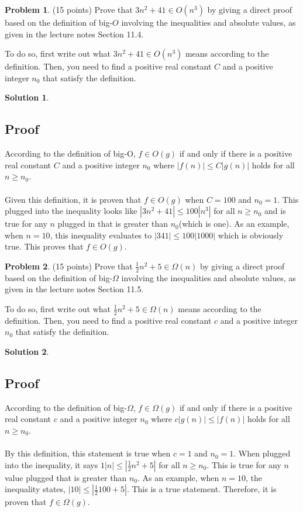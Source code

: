 \documentclass{article}
\theoremstyle{definition}
\newtheorem{problem}{Problem}
\newtheorem*{solution}{Solution}
\begin{document}
\newpage
\begin{problem} (15 points)
Prove that $3n^2+41 \in O(n^3)$ by giving a direct proof based on the definition of 
big-$O$ involving the inequalities and absolute values, as given in the lecture notes 
Section 11.4.  

To do so, first write out what $3n^2+41 \in O(n^3)$ means according to the definition.  
Then, you need to find a positive real constant $C$ and a positive integer $n_0$ 
that satisfy the definition.
\end{problem}
\begin{solution}
\hspace{1cm}
\subsection*{Proof}
According to the definition of big-O, $f \in O(g)$ if and only if there is a positive real constant $C$ and a positive integer $n_0$ where $|f(n)| \leqslant C|g(n)|$ holds for all $n \geqslant n_0$.\\\\
Given this definition, it is proven that $f \in O(g)$ when $C = 100$ and $n_0 = 1$. This plugged into the inequality looks like $|3n^2+41| \leqslant 100|n^3|$ for all $n \geqslant n_0$ and is true for any $n$ plugged in that is greater than $n_0$(which is one). As an example, when $n = 10$, this inequality evaluates to $|341| \leqslant 100|1000|$ which is obviously true. This proves that $f \in O(g)$.
\end{solution}

\newpage
\begin{problem} (15 points) 
Prove that $\frac{1}{2}n^2+5 \in \Omega(n)$ by giving a direct proof based on the 
definition of big-$\Omega$ involving the inequalities and absolute values, as given 
in the lecture notes Section 11.5.

To do so, first write out what $\frac{1}{2}n^2+5 \in \Omega(n)$ means according 
to the definition. Then, you need to find a positive real constant $c$ and a positive integer $n_0$ 
that satisfy the definition.
\end{problem}
\begin{solution}
\hspace{1cm}
\subsection*{Proof}
According to the definition of big-$\Omega$, $f \in \Omega(g)$ if and only if there is a positive real constant $c$ and a positive integer $n_0$ where $c|g(n)| \leqslant |f(n)|$ holds for all $n \geqslant n_0$.\\\\
By this definition, this statement is true when $c = 1$ and $n_0 = 1$. When plugged into the inequality, it says $1|n| \leqslant |\frac{1}{2}n^2 +5|$ for all $n \geqslant n_0$. This is true for any $n$ value plugged that is greater than $n_0$. As an example, when $n = 10$, the inequality states, $|10| \leqslant |\frac{1}{2}100 + 5|$. This is a true statement. Therefore, it is proven that $f \in \Omega(g)$.
\end{solution}
\end{document}
